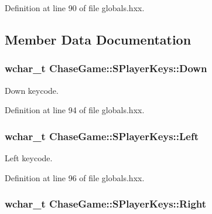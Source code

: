 Definition at line 90 of file globals.\-hxx.



\subsection{Member Data Documentation}
\hypertarget{struct_chase_game_1_1_s_player_keys_abe56af951c133c98b24401542f28ec9b}{
\subsubsection[{Down}]{\setlength{\rightskip}{0pt plus 5cm}wchar\-\_\-t Chase\-Game\-::\-S\-Player\-Keys\-::\-Down}}\label{struct_chase_game_1_1_s_player_keys_abe56af951c133c98b24401542f28ec9b}


Down keycode. 



Definition at line 94 of file globals.\-hxx.

\hypertarget{struct_chase_game_1_1_s_player_keys_ab6c4f7e03fa43cd9443dcbd16a5e3250}{
\subsubsection[{Left}]{\setlength{\rightskip}{0pt plus 5cm}wchar\-\_\-t Chase\-Game\-::\-S\-Player\-Keys\-::\-Left}}\label{struct_chase_game_1_1_s_player_keys_ab6c4f7e03fa43cd9443dcbd16a5e3250}


Left keycode. 



Definition at line 96 of file globals.\-hxx.

\hypertarget{struct_chase_game_1_1_s_player_keys_a17ec0fea68ec78ad4577c6b56b83fa15}{
\subsubsection[{Right}]{\setlength{\rightskip}{0pt plus 5cm}wchar\-\_\-t Chase\-Game\-::\-S\-Player\-Keys\-::\-Right}}\label{struct_chase_game_1_1_s_player_keys_a17ec0fea68ec78ad4577c6b56b83fa15}


